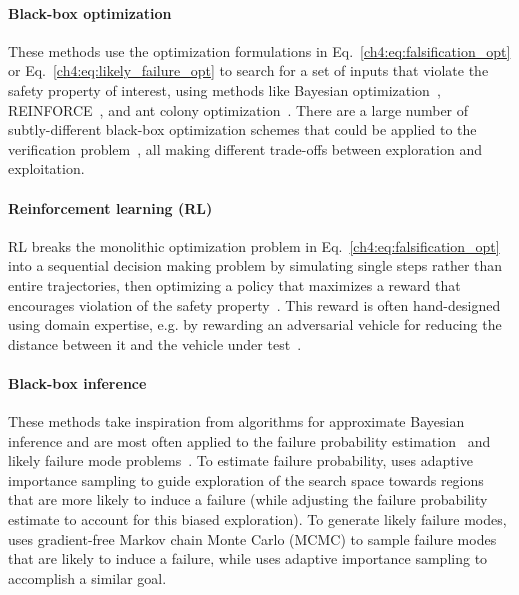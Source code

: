 \paragraph{Black-box optimization} These methods use the optimization formulations in Eq.~\eqref{ch4:eq:falsification_opt} or Eq.~\eqref{ch4:eq:likely_failure_opt} to search for a set of inputs that violate the safety property of interest, using methods like Bayesian optimization~\cite{wangAdvSimGeneratingSafetyCritical2021}, REINFORCE~\cite{dingLearningCollideAdaptive2020a}, and ant colony optimization~\cite{annpureddySTaLiRoToolTemporal2011}. There are a large number of subtly-different black-box optimization schemes that could be applied to the verification problem~\cite{kochenderfer_wheeler_2019}, all making different trade-offs between exploration and exploitation.

\paragraph{Reinforcement learning (RL)} RL breaks the monolithic optimization problem in Eq.~\eqref{ch4:eq:falsification_opt} into a sequential decision making problem by simulating single steps rather than entire trajectories, then optimizing a policy that maximizes a reward that encourages violation of the safety property~\cite{corsoAdaptiveStressTesting2019}. This reward is often hand-designed using domain expertise, e.g. by rewarding an adversarial vehicle for reducing the distance between it and the vehicle under test~\cite{dingLearningCollideAdaptive2020a}.

\paragraph{Black-box inference} These methods take inspiration from algorithms for approximate Bayesian inference and are most often applied to the failure probability estimation~\cite{okellyScalableEndtoEndAutonomous2018} and likely failure mode problems~\cite{zhouRoCUSRobotController2021}. To estimate failure probability, \cite{okellyScalableEndtoEndAutonomous2018} uses adaptive importance sampling to guide exploration of the search space towards regions that are more likely to induce a failure (while adjusting the failure probability estimate to account for this biased exploration). To generate likely failure modes, \cite{zhouRoCUSRobotController2021} uses gradient-free Markov chain Monte Carlo (MCMC) to sample failure modes that are likely to induce a failure, while \cite{okellyScalableEndtoEndAutonomous2018} uses adaptive importance sampling to accomplish a similar goal.


